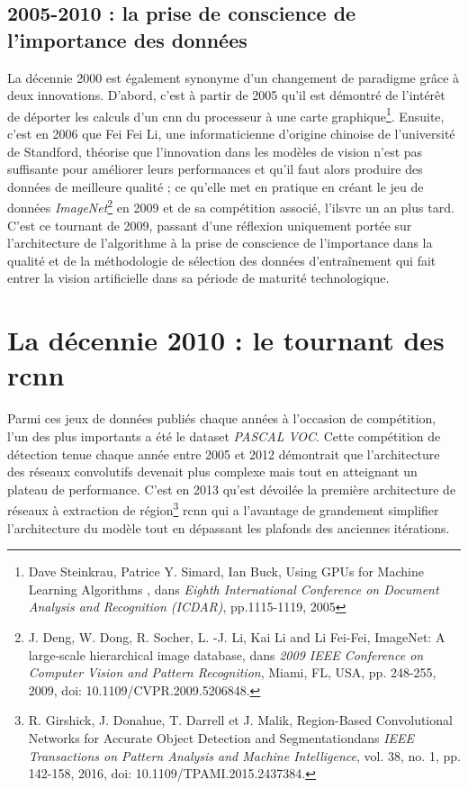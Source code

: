 \subsection{2005-2010 : la prise de conscience de l'importance des données}
La décennie 2000 est également synonyme d'un changement de paradigme grâce à deux innovations. D'abord, c'est à partir de 2005 qu'il est démontré de l'intérêt de déporter les calculs d'un \gls{cnn} du processeur à une carte graphique\footnote{Dave Steinkrau, Patrice Y. Simard, Ian Buck, \og Using GPUs for Machine Learning Algorithms \fg, dans \textit{Eighth International Conference on Document Analysis and Recognition (ICDAR)}, pp.1115-1119, 2005}. Ensuite, c'est en 2006 que Fei Fei Li, une informaticienne d'origine chinoise de l'université de Standford, théorise que l'innovation dans les modèles de vision n'est pas suffisante pour améliorer leurs performances et qu'il faut alors produire des données de meilleure qualité ; ce qu'elle met en pratique en créant le jeu de données \textit{ImageNet}\footnote{J. Deng, W. Dong, R. Socher, L. -J. Li, Kai Li and Li Fei-Fei, \og ImageNet: A large-scale hierarchical image database\fg, dans \textit{2009 IEEE Conference on Computer Vision and Pattern Recognition}, Miami, FL, USA, pp. 248-255, 2009, doi: 10.1109/CVPR.2009.5206848.} en 2009 et de sa compétition associé, l'\gls{ilsvrc} un an plus tard. C'est ce tournant de 2009, passant d'une réflexion uniquement portée sur l'architecture de l'algorithme à la prise de conscience de l'importance dans la qualité et de la méthodologie de sélection des données d'entraînement qui fait entrer la vision artificielle dans sa période de maturité technologique.

\section[La vision aujourd'hui]{La décennie 2010 : le tournant des \gls{rcnn}}

Parmi ces jeux de données publiés chaque années à l'occasion de compétition, l'un des plus importants a été le dataset \textit{PASCAL VOC}. Cette compétition de détection tenue chaque année entre 2005 et 2012 démontrait que l'architecture des réseaux convolutifs devenait plus complexe mais tout en atteignant un plateau de performance. C'est en 2013 qu'est dévoilée la première architecture de réseaux à extraction de région\footnote{R. Girshick, J. Donahue, T. Darrell et J. Malik, \og Region-Based Convolutional Networks for Accurate Object Detection and Segmentation\fg dans \textit{IEEE Transactions on Pattern Analysis and Machine Intelligence}, vol. 38, no. 1, pp. 142-158, 2016, doi: 10.1109/TPAMI.2015.2437384.} \gls{rcnn} qui a l'avantage de grandement simplifier l'architecture du modèle tout en dépassant les plafonds des anciennes itérations.


